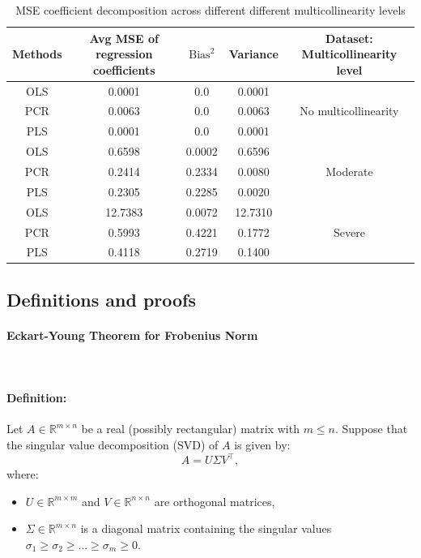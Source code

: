 \documentclass[11pt,twoside,a4paper]{article}
\begin{document}
\begin{table}[h]
    \centering
    \begin{tabular}{|c|c|c|c|c|}
        \hline
        Methods & Avg MSE of regression coefficients &  $\text{Bias}^2$ & Variance & Dataset: Multicollinearity level \\
        \hline
        OLS & 0.0001 & 0.0 & 0.0001 & \multirow{3}{*}{No multicollinearity} \\
        PCR & 0.0063 & 0.0 & 0.0063 &  \\
        PLS & 0.0001 & 0.0 & 0.0001 &  \\
        \hline
        OLS & 0.6598 & 0.0002 & 0.6596 & \multirow{3}{*}{Moderate} \\        
        PCR & 0.2414 & 0.2334 & 0.0080 &  \\
        PLS & 0.2305 & 0.2285 & 0.0020 &  \\
        \hline
        OLS & 12.7383 & 0.0072 & 12.7310 & \multirow{3}{*}{Severe} \\
        PCR & 0.5993 & 0.4221 & 0.1772 &  \\
        PLS & 0.4118 & 0.2719 & 0.1400 &  \\ 
        \hline
    \end{tabular}
    \caption{MSE coefficient decomposition across different different multicollinearity levels}
    \label{tab:Stability_analysis}
\end{table}
\newpage

\subsection{Definitions and proofs}

\paragraph{Eckart-Young Theorem for Frobenius Norm} \ \

\paragraph{Definition:}
Let $A \in \mathbb{R}^{m \times n}$ be a real (possibly rectangular) matrix with $m \leq n$. Suppose that the singular value decomposition (SVD) of $A$ is given by:
\begin{equation}
    A = U \Sigma V^{\top},
\end{equation}
where:
\begin{itemize}
    \item $U \in \mathbb{R}^{m \times m}$ and $V \in \mathbb{R}^{n \times n}$ are orthogonal matrices,
    \item $\Sigma \in \mathbb{R}^{m \times n}$ is a diagonal matrix containing the singular values $\sigma_1 \geq \sigma_2 \geq \dots \geq \sigma_m \geq 0$.
\end{itemize}
\end{document}
